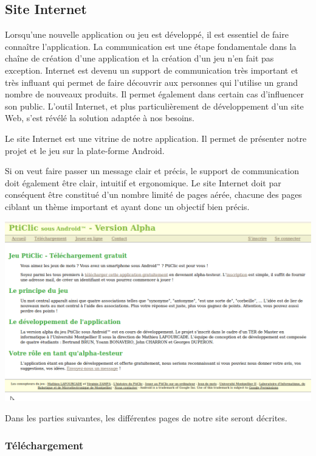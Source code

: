 \documentclass[a4paper,11pt,french]{article}
\def\android{Android\texttrademark{}}
\begin{document}
\pagebreak

\subsection{Site Internet}

Lorsqu'une nouvelle application ou jeu est développé, il est essentiel de faire connaître l'application.
La communication est une étape fondamentale dans la chaîne de création d'une application et la création d'un jeu n'en fait pas exception.
Internet est devenu un support de communication très important et très influant qui permet de faire découvrir aux
personnes qui l'utilise un grand nombre de nouveaux produits. Il permet également dans certain cas d'influencer son public.
L'outil Internet, et plus particulièrement de développement d'un site Web, s'est révélé la solution adaptée à nos besoins.

Le site Internet est une vitrine de notre application. Il permet de présenter notre projet et le jeu sur la plate-forme \android{}.

Si on veut faire passer un message clair et précis, le support de communication doit également être clair, intuitif et ergonomique. Le site Internet 
doit par conséquent être constitué d'un nombre limité de pages aérée, chacune des pages ciblant un thème important et ayant donc un objectif bien précis.

\begin{center}
\includegraphics[width=14cm]{img/siteAccueil.png}
\end{center}

Dans les parties suivantes, les différentes pages de notre site seront décrites. 



\subsubsection{Téléchargement}
\end{document}
